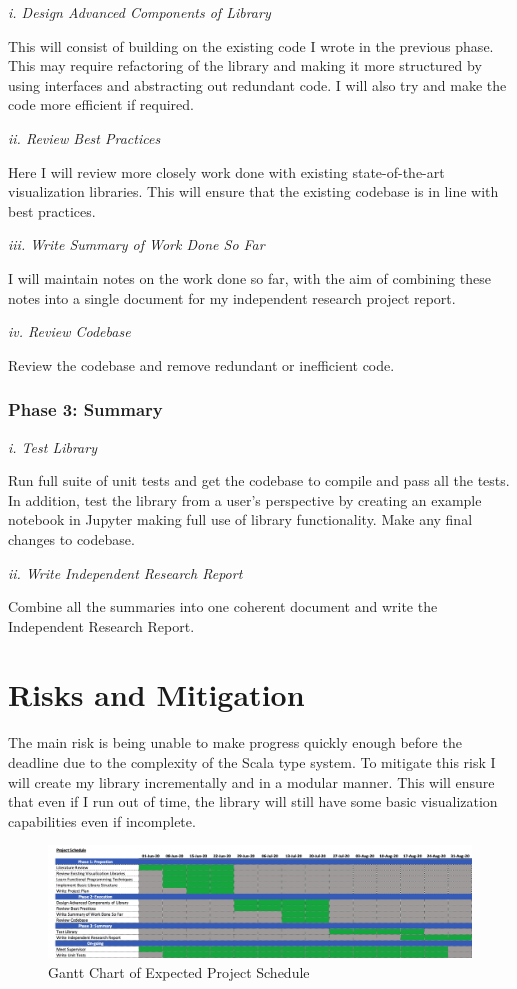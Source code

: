 \documentclass[12pt]{article}
\begin{document}
\textit{i. Design Advanced Components of Library}

This will consist of building on the existing code I wrote in the previous phase. This may require refactoring of the library and making it more structured by using interfaces and abstracting out redundant code. I will also try and make the code more efficient if required.

\textit{ii. Review Best Practices}

Here I will review more closely work done with existing state-of-the-art visualization libraries. This will ensure that the existing codebase is in line with best practices.

\textit{iii. Write Summary of Work Done So Far}

I will maintain notes on the work done so far, with the aim of combining these notes into a single document for my independent research project report.

\textit{iv. Review Codebase}

Review the codebase and remove redundant or inefficient code. 

\subsubsection{Phase 3: Summary}

\textit{i. Test Library}

Run full suite of unit tests and get the codebase to compile and pass all the tests. In addition, test the library from a user's perspective by creating an example notebook in Jupyter making full use of library functionality. Make any final changes to codebase.

\textit{ii. Write Independent Research Report}

Combine all the summaries into one coherent document and write the Independent Research Report.

\section{Risks and Mitigation}

The main risk is being unable to make progress quickly enough before the deadline due to the complexity of the Scala type system. To mitigate this risk I will create my library incrementally and in a modular manner. This will ensure that even if I run out of time, the library will still have some basic visualization capabilities even if incomplete.

\pagebreak
\begin{landscape}
	
\begin{figure}[h]
\begin{center}
\includegraphics[scale=0.65]{Gantt}
\end{center}
\caption{Gantt Chart of Expected Project Schedule}
\end{figure}

\end{landscape}
\pagebreak
\printbibliography
\end{document}
